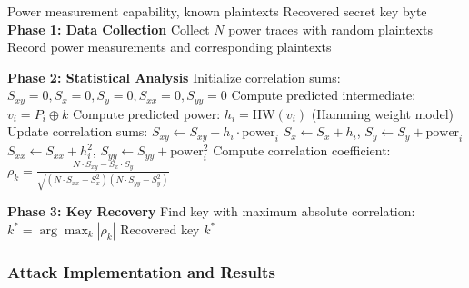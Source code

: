 \documentclass[11pt,a4paper]{article}
\theoremstyle{definition}
\begin{document}
\begin{algorithm}
\caption{Simple Power Analysis Attack}
\begin{algorithmic}[1]
\REQUIRE Power measurement capability, known plaintexts
\ENSURE Recovered secret key byte
\STATE \textbf{Phase 1: Data Collection}
\STATE Collect $N$ power traces with random plaintexts
\STATE Record power measurements and corresponding plaintexts

\STATE \textbf{Phase 2: Statistical Analysis}
    \STATE Initialize correlation sums: $S_{xy} = 0, S_x = 0, S_y = 0, S_{xx} = 0, S_{yy} = 0$
        \STATE Compute predicted intermediate: $v_i = P_i \oplus k$
        \STATE Compute predicted power: $h_i = \text{HW}(v_i)$ (Hamming weight model)
        \STATE Update correlation sums:
        \STATE $S_{xy} \leftarrow S_{xy} + h_i \cdot \text{power}_i$
        \STATE $S_x \leftarrow S_x + h_i$, $S_y \leftarrow S_y + \text{power}_i$
        \STATE $S_{xx} \leftarrow S_{xx} + h_i^2$, $S_{yy} \leftarrow S_{yy} + \text{power}_i^2$
    \ENDFOR
    \STATE Compute correlation coefficient:
    \STATE $\rho_k = \frac{N \cdot S_{xy} - S_x \cdot S_y}{\sqrt{(N \cdot S_{xx} - S_x^2)(N \cdot S_{yy} - S_y^2)}}$
\ENDFOR

\STATE \textbf{Phase 3: Key Recovery}
\STATE Find key with maximum absolute correlation: $k^* = \arg\max_k |\rho_k|$
\RETURN Recovered key $k^*$
\end{algorithmic}
\end{algorithm}

\subsubsection{Attack Implementation and Results}
\end{document}
